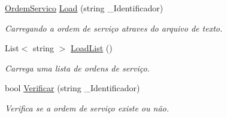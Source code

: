 \begin{DoxyCompactItemize}
\hyperlink{class_model_1_1_ordem__de___servico_1_1_ordem_servico}{Ordem\+Servico} \hyperlink{class_model_1_1_ordem__de___servico_1_1_ordem_servico_a95c474e94611ca6f442866080dc19989}{Load} (string \+\_\+\+Identificador)
\begin{DoxyCompactList}\small\item\em Carregando a ordem de serviço atraves do arquivo de texto. \end{DoxyCompactList}\item 
List$<$ string $>$ \hyperlink{class_model_1_1_ordem__de___servico_1_1_ordem_servico_ae03ea1385455c47aa9adf39ab00fd72b}{Load\+List} ()
\begin{DoxyCompactList}\small\item\em Carrega uma lista de ordens de serviço. \end{DoxyCompactList}\item 
bool \hyperlink{class_model_1_1_ordem__de___servico_1_1_ordem_servico_a7959729db61c05f75261ce288e579ec2}{Verificar} (string \+\_\+\+Identificador)
\begin{DoxyCompactList}\small\item\em Verifica se a ordem de serviço existe ou não. \end{DoxyCompactList}\end{DoxyCompactItemize}

